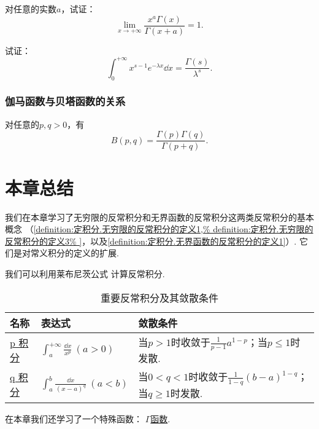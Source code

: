 \begin{example}
对任意的实数\(a\)，试证：\[
\lim\limits_{x\to+\infty} \frac{x^a \Gamma(x)}{\Gamma(x+a)} = 1.
\]
\end{example}

\begin{example}
试证：\begin{equation}
\int_0^{+\infty} x^{s-1} e^{-\lambda x} \dd{x}
= \frac{\Gamma(s)}{\lambda^s}.
\end{equation}
\end{example}

\subsubsection{伽马函数与贝塔函数的关系}
\begin{theorem}
对任意的\(p,q>0\)，有\begin{equation}\label{equation:定积分.伽马函数与贝塔函数的关系}
B(p,q) = \frac{\Gamma(p) \Gamma(q)}{\Gamma(p+q)}.
\end{equation}
\end{theorem}

\section{本章总结}

我们在本章学习了无穷限的反常积分和无界函数的反常积分这两类反常积分的基本概念%
（\cref{definition:定积分.无穷限的反常积分的定义1,%
definition:定积分.无穷限的反常积分的定义3%
}，以及\cref{definition:定积分.无界函数的反常积分的定义1}）.
它们是对常义积分的定义的扩展.

我们可以利用莱布尼茨公式
计算反常积分.

\begin{table}[hb]
	\centering
	\begin{tabular}{*3l}
		\hline
		名称 & 表达式 & 敛散条件 \\
		\hline
		{\hyperref[example:定积分.p积分]{p 积分}}
			& \(\int_a^{+\infty} \frac{\dd{x}}{x^p}\ (a>0)\)
			& 当\(p > 1\)时收敛于\(\frac{1}{p-1} a^{1-p}\)；当\(p \leq 1\)时发散. \\[.5cm]
		{\hyperref[example:定积分.q积分]{q 积分}}
			& \(\int_a^b \frac{\dd{x}}{(x-a)^q}\ (a<b)\)
			& 当\(0 < q < 1\)时收敛于\(\frac{1}{1-q} (b-a)^{1-q}\)；当\(q \geq 1\)时发散. \\[.5cm]
		\hline
	\end{tabular}
	\caption{重要反常积分及其敛散条件}
\end{table}

在本章我们还学习了一个特殊函数：
\hyperref[equation:特殊函数.伽马函数的积分定义]{\(\Gamma\)函数}.
